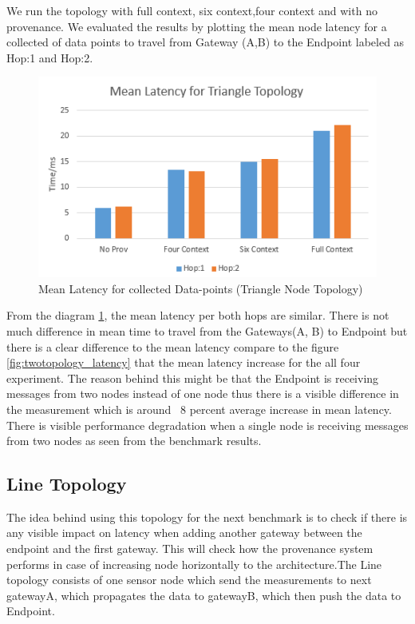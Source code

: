 We run the topology with full context, six context,four context and with no provenance. We evaluated the results by plotting the mean node latency for a collected of data points
to travel from Gateway (A,B) to the Endpoint labeled as Hop:1  and Hop:2.
\begin{figure}[H]
	\center
	\includegraphics[width=\textwidth]{figures/triangletopology_latency.PNG}
	\caption{Mean Latency for collected Data-points  (Triangle Node Topology)}
	\label{fig:triangletopology_latency}
\end{figure}

From the diagram \ref{fig:triangletopology_latency}, the mean latency per both hops are similar. There is not much difference in mean time to travel from the Gateways(A, B) to Endpoint but there is a clear difference to the mean latency compare to the figure \ref{fig:twotopology_latency} that the mean latency increase for the all four experiment. The reason behind this might be that the Endpoint is receiving messages from two nodes instead of one node thus there is a visible difference in the measurement which is around ~8 percent average increase in mean latency. There is visible performance degradation when a single node is receiving messages from two nodes as seen from the benchmark results.

\subsection{Line Topology}
The idea behind using this topology for the next benchmark is to check if there is any visible impact on latency when adding another gateway between the endpoint and the first gateway. This will check how the provenance system performs in case of increasing node horizontally to the architecture.The Line topology consists of one sensor node which send the measurements to next gatewayA, which propagates the data to gatewayB, which then push the data to Endpoint. 

